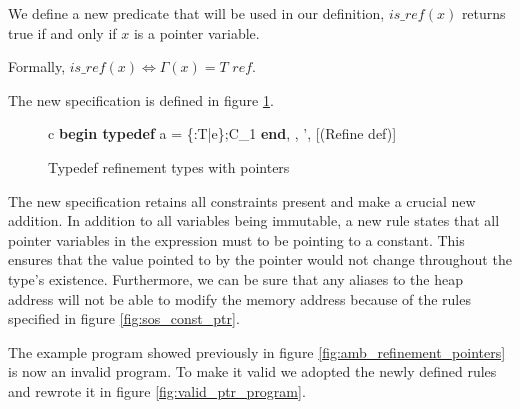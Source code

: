 \documentclass[a4paper,12pt]{report}
\begin{document}
\par
We define a new predicate that will be used in our definition, $is\_ref(x)$ 
returns true if and only if $x$ is a pointer variable.
\par
Formally, $is\_ref(x) \Leftrightarrow \Gamma(x) = T\textit{ ref}$.

\par
The new specification is defined in figure \ref{fig:immu_pointer_typedef}.

\begin{figure}[H]
  \begin{center}
    \begin{tabular}{c}
      {\langle \textbf{begin typedef } a = \{\upsilon :T\text{ }|\text{ }e\};C_1\textbf{ end}, 
      \sigma, \tau \rangle \longrightarrow 
        \langle \sigma', \tau \rangle}[(Refine def)]
    \end{tabular}
  \end{center}
  \caption{Typedef refinement types with pointers}
  \label{fig:immu_pointer_typedef}
\end{figure}

\par
The new specification retains all constraints present and make a crucial 
new addition. In addition to all variables being immutable, a new rule states 
that all pointer variables in the expression must to be pointing to a constant. 
This ensures that the value pointed 
to by the pointer would not change throughout the type's existence. Furthermore, 
we can be sure that any aliases to the heap 
address will not be able to modify the memory address because of the rules 
specified in figure \ref{fig:sos_const_ptr}.

\par
The example program showed previously in figure \ref{fig:amb_refinement_pointers} 
is now an invalid program. To make it valid we adopted the newly defined rules 
and rewrote it in figure \ref{fig:valid_ptr_program}.
\end{document}
